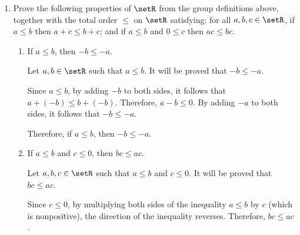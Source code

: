 \begin{enumerate}
\begin{enumerate}
\begin{subprove}
      Suppose that \(a \neq 0\).
      Since \((\setR^*, \cdot)\) is a group, \(a\) has a multiplicative inverse \(a^{-1} \in \setR^*\).
      By multiplying both sides of the equation \(a b = 0\) by \(a^{-1}\), it follows that \(b = a^{-1} \cdot 0 = 0\).
      
      Therefore, if \(a b = 0\) and \(a \neq 0\), then \(b = 0\).
      Hence, if \(a b = 0\), then either \(a = 0\) or \(b = 0\).
    \end{subprove}
    \item \(-a=(-1)a\).
    \begin{subprove}
      Let \(a \in \setR\).
      It will be proved that \(-a = (-1) a\).
      
      Since \(0 = 0 \cdot a\), by the previous result, \(0 = (1 + (-1)) a = 1 \cdot a + (-1) a = a + (-1) a\).
      By adding the additive inverse of \(a\) to both sides, it follows that \(-a = (-1) a\).
      
      Therefore, \(-a = (-1) a\).
    \end{subprove}
  \end{enumerate}

  \item Prove the following properties of \(\setR\) from the group definitions above, together with the total order \(\le\) on \(\setR\) satisfying: for all \(a,b,c\in\setR\), if \(a\le b\) then \(a+c\le b+c\); and if \(a\le b\) and \(0\le c\) then \(ac\le bc\).
  \begin{enumerate}
    \item If \(a\le b\), then \(-b\le -a\).
    \begin{subprove}
      Let \(a, b \in \setR\) such that \(a \le b\).
      It will be proved that \(-b \le -a\).
      
      Since \(a \le b\), by adding \(-b\) to both sides, it follows that \(a + (-b) \le b + (-b)\).
      Therefore, \(a - b \le 0\).
      By adding \(-a\) to both sides, it follows that \(-b \le -a\).
      
      Therefore, if \(a \le b\), then \(-b \le -a\).
    \end{subprove}
    \item If \(a\le b\) and \(c\le 0\), then \(bc\le ac\).
    \begin{subprove}
      Let \(a, b, c \in \setR\) such that \(a \le b\) and \(c \le 0\).
      It will be proved that \(b c \le a c\).
      
      Since \(c \le 0\), by multiplying both sides of the inequality \(a \le b\) by \(c\) (which is nonpositive), the direction of the inequality reverses.
      Therefore, \(b c \le a c\).
      

\end{subprove}
\end{enumerate}
\end{enumerate}
